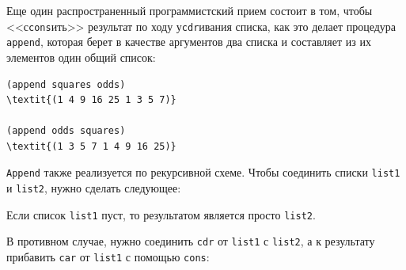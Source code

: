 Еще один распространенный программистский прием состоит в 
том, чтобы <<с{\tt cons}ить>> результат по
ходу
у{\tt cdr}ивания списка, как это делает
процедура 
{\tt append}, которая берет в качестве аргументов два списка
и
составляет из их элементов один общий список:

\begin{Verbatim}[fontsize=\small]
(append squares odds)
\textit{(1 4 9 16 25 1 3 5 7)}

(append odds squares)
\textit{(1 3 5 7 1 4 9 16 25)}
\end{Verbatim}
{\tt Append} также реализуется по рекурсивной схеме. Чтобы
соединить списки {\tt list1} и {\tt list2}, нужно
сделать следующее:

\begin{plainlist}


\item
Если список {\tt list1} пуст, то результатом 
является просто {\tt list2}.

\item
В противном случае, нужно соединить
{\tt cdr} от {\tt list1} с {\tt list2}, а к
результату прибавить {\tt car} от {\tt list1} с помощью
{\tt cons}:
\end{plainlist}

